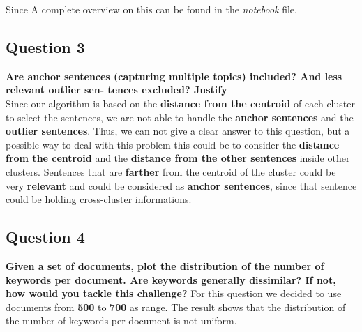 Since A complete overview on this can be found in the \textit{notebook} file.

\subsection{Question 3}
\textbf{ Are anchor sentences (capturing multiple topics) included? And less relevant outlier sen- tences excluded? Justify} \\
Since our algorithm is based on the \textbf{distance from the centroid} of each
cluster to select the sentences, we are not able to handle the \textbf{anchor
  sentences} and the \textbf{outlier sentences}. Thus, we can not give a clear
answer to this question, but a possible way to deal with this problem this could be to consider
the \textbf{distance from the centroid} and the \textbf{distance from the other
  sentences} inside other clusters. Sentences that are \textbf{farther} from the
centroid of the cluster could be very \textbf{relevant} and could be considered
as \textbf{anchor sentences}, since that sentence could be holding cross-cluster informations.

\subsection{Question 4}
\textbf{Given a set of documents, plot the distribution of the number of keywords per document. Are keywords generally dissimilar? If not, how would you tackle this challenge?}
For this question we decided to use documents from \textbf{500} to \textbf{700} as range.
The result shows that the distribution of the number of keywords per
document is not uniform.

